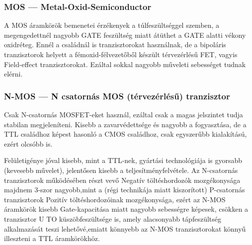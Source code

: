 \subsubsection{MOS --- Metal-Oxid-Semiconductor}
A MOS áramkörök bemenetei érzékenyek a túlfeszültséggel szemben, a megengedettnél nagyobb GATE feszültség miatt átüthet a GATE alatti vékony oxidréteg. Ennél a családnál is tranzisztorokat használnak, de a bipoláris tranzisztorok helyett a fémoxid-félvezetőből készült térvezérlésű FET, vagyis Field-effect tranzisztorokat. Ezáltal sokkal nagyobb műveleti sebességet tudnak elérni.

\subsubsection{N-MOS --- N csatornás MOS (térvezérlésű) tranzisztor}
Csak N-csatornás MOSFET-eket használ, ezáltal csak a magas jelszintet tudja stabilan megjeleníteni. Kisebb a zavarvédettsége és nagyobb a fogyasztása, de a TTL családhoz képest hasonló a CMOS családhoz, csak egyszerűbb kialakítású, ezért olcsóbb is.

Felületigénye jóval kisebb, mint a TTL-nek, gyártási technológiája is gyorsabb (kevesebb művelet), jelentősen kisebb a teljesítményfelvétele. Az N-csatornás tranzisztorok működésében részt vevő Negatív töltéshordozók mozgékonysága majdnem 3-szor nagyobb,mint a (régi technikája miatt kiszorított) P-csatornás tranzisztorok Pozitív töltéshordozóinak mozgékonysága, ezért az N-MOS áramkörök kisebb Gate-kapacitása miatt nagyobb sebességre képesek, csökken a tranzisztor U TO küszöbfeszültsége is, amely alacsonyabb tápfeszültség alkalmazását teszi lehetővé,emiatt könnyebb az N-MOS tranzisztorokat könnyű illeszteni a TTL áramkörökhöz.

